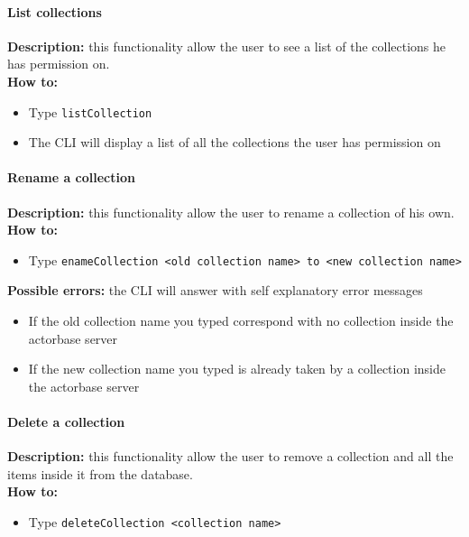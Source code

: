 \documentclass{scalatekids-article}
\begin{document}
\paragraph{List collections}
\label{sec:listcollection}
\textbf{Description:} this functionality allow the user to see a list of 
the collections he has permission on.\\
\textbf{How to:} 
\begin{itemize}
	\item Type \texttt{listCollection}
	\item The CLI will display a list of all the collections the user has 
	permission on
\end{itemize}

\paragraph{Rename a collection}
\label{sec:renamecollection}
\textbf{Description:} this functionality allow the user to rename a 
collection of his own.\\
\textbf{How to:} 
\begin{itemize}
	\item Type \texttt{enameCollection <old collection name> to <new collection name>}
\end{itemize}
\textbf{Possible errors:} the CLI will answer with self explanatory error messages 
\begin{itemize}
	\item If the old collection name you typed correspond with no collection inside the actorbase server
	\item If the new collection name you typed is already taken by a collection inside the actorbase server 
\end{itemize}

\paragraph{Delete a collection}
\label{sec:deletecollection}
\textbf{Description:} this functionality allow the user to remove a collection and all the items inside it from the database.\\
\textbf{How to:} 
\begin{itemize}
	\item Type \texttt{deleteCollection <collection name>}
\end{itemize}
\end{document}
